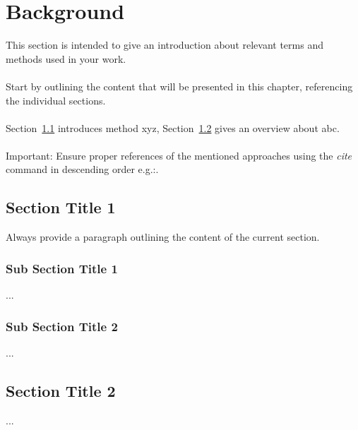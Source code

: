 \chapter{Background\label{cha:chapter2}}
This section is intended to give an introduction about relevant terms and methods used in your work.
\\
\\
Start by outlining the content that will be presented in this chapter, referencing the individual sections. 
\\
\\
Section~\ref{sec:section1} introduces method xyz, Section~\ref{sec:section2} gives an overview about abc. 
\\
\\
\noindent
Important: Ensure proper references of the mentioned approaches using the \emph{cite} command in descending order e.g.:\cite{boehm2019systemds, kumar2017data}.

\section{Section Title 1}
\label{sec:section1}
Always provide a paragraph outlining the content of the current section. 

\subsection{Sub Section Title 1}
\label{subsec:subsection1}
...

\subsection{Sub Section Title 2}
\label{subsec:subsection2}
...

\section{Section Title 2}
\label{sec:section2}
...
